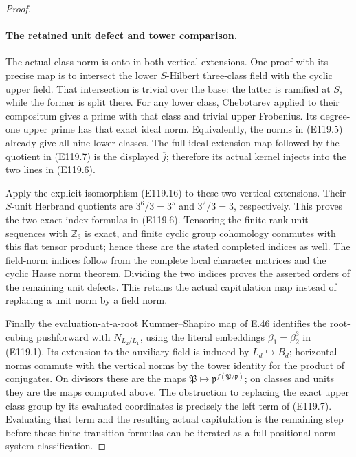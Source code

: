 \begin{proof}
\paragraph{The retained unit defect and tower comparison.}
The actual class norm is onto in both vertical extensions.
One proof with its precise map is to intersect the lower
$S$-Hilbert three-class field with the cyclic upper field.
That intersection is trivial over the base: the latter is
ramified at $S$, while the former is split there. For any
lower class, Chebotarev applied to their compositum gives a
prime with that class and trivial upper Frobenius. Its degree-one
upper prime has that exact ideal norm. Equivalently, the norms
in (E119.5) already give all nine lower classes.
The full ideal-extension map followed by the quotient in
(E119.7) is the displayed $\overline j$; therefore its actual
kernel injects into the two lines in (E119.6).

Apply the explicit isomorphism (E119.16) to these two vertical
extensions. Their $S$-unit Herbrand quotients are $3^6/3=3^5$
and $3^2/3=3$, respectively. This proves the two exact index
formulas in (E119.6). Tensoring the finite-rank unit sequences
with $\mathbb Z_3$ is exact, and finite cyclic group cohomology
commutes with this flat tensor product; hence these are the
stated completed indices as well. The field-norm indices follow
from the complete local character matrices and the cyclic Hasse
norm theorem. Dividing the two indices proves the asserted
orders of the remaining unit defects. This retains the actual
capitulation map instead of replacing a unit norm by a field norm.

Finally the evaluation-at-a-root Kummer--Shapiro map of E.46
identifies the root-cubing pushforward with
$N_{L_2/L_1}$, using the literal embeddings
$\beta_1=\beta_2^3$ in (E119.1). Its extension to the auxiliary
field is induced by $L_d\hookrightarrow B_d$; horizontal norms
commute with the vertical norms by the tower identity for
the product of conjugates. On divisors these are the maps
$\mathfrak P\mapsto\mathfrak p^{f(\mathfrak P/\mathfrak p)}$;
on classes and units they are the maps computed above.
The obstruction to replacing the exact upper class group by
its evaluated coordinates is precisely the left term of
(E119.7). Evaluating that term and the resulting actual
capitulation is the remaining step before these finite
transition formulas can be iterated as a full positional
norm-system classification.
\end{proof}
